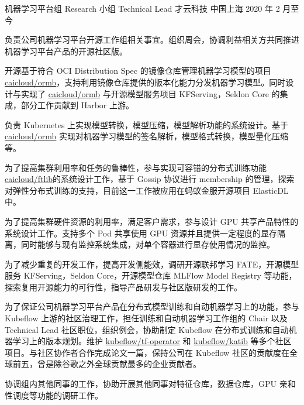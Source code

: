 

\begin{cventries}

  \cventry
    {机器学习平台组 Research 小组 Technical Lead} %
    {才云科技} %
    {中国上海} %
    {2020 年 2 月至今} %
    {
      \begin{cvitems} %
        \item 负责公司机器学习平台开源工作组相关事宜。组织周会，协调利益相关方共同推进机器学习平台产品的开源社区版。
        \item 开源基于符合 OCI Distribution Spec 的镜像仓库管理机器学习模型的项目 \href{https://github.com/caicloud/ormb}{caicloud/ormb}，支持利用镜像仓库提供的版本化能力分发机器学习模型。同时设计与实现了 \href{https://github.com/caicloud/ormb}{caicloud/ormb} 与开源模型服务项目 KFServing，Seldon Core 的集成，部分工作贡献到 Harbor 上游。
        \item 负责 Kubernetes 上实现模型转换，模型压缩，模型解析功能的系统设计。基于 \href{https://github.com/caicloud/ormb}{caicloud/ormb} 实现对机器学习模型的签名解析，模型格式转换，模型量化压缩等。
        \item 为了提高集群利用率和任务的鲁棒性，参与实现可容错的分布式训练功能 \href{https://github.com/caicloud/ftlib}{caicloud/ftlib}的系统设计工作，基于 Gossip 协议进行 membership 的管理，探索对弹性分布式训练的支持，目前这一工作被应用在蚂蚁金服开源项目 ElasticDL 中。
        \item 为了提高集群硬件资源的利用率，满足客户需求，参与设计 GPU 共享产品特性的系统设计工作。支持多个 Pod 共享使用 GPU 资源并且提供一定程度的显存隔离，同时能够与现有监控系统集成，对单个容器进行显存使用情况的监控。
        \item 为了减少重复的开发工作，提高开发侧能效，调研开源联邦学习 FATE，开源模型服务 KFServing，Seldon Core，开源模型仓库 MLFlow Model Registry 等功能，探索复用开源能力的可行性，指导产品研发与社区版研发的工作。
        \item 为了保证公司机器学习平台产品在分布式模型训练和自动机器学习上的功能，参与 Kubeflow 上游的社区治理工作，担任训练和自动机器学习工作组的 Chair 以及 Technical Lead 社区职位，组织例会，协助制定 Kubeflow 在分布式训练和自动机器学习上的版本规划。维护 \href{https://github.com/kubeflow/tf-operator}{kubeflow/tf-operator} 和 \href{https://github.com/kubeflow/katib}{kubeflow/katib} 等多个社区项目。与社区协作者合作完成论文一篇，保持公司在 Kubeflow 社区的贡献度在全球前五，曾是除谷歌之外全球贡献最多的企业贡献者。
        \item 协调组内其他同事的工作，协助开展其他同事对特征仓库，数据仓库，GPU 亲和性调度等功能的调研工作。
      \end{cvitems}
    }


\end{cventries}
